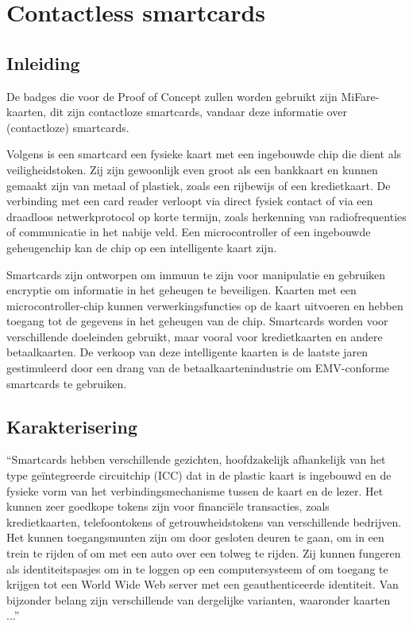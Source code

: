 \section{Contactless smartcards}
\subsection{Inleiding}
De badges die voor de Proof of Concept zullen worden gebruikt zijn MiFare-kaarten, dit zijn contactloze smartcards, vandaar deze informatie over (contactloze) smartcards.

Volgens \textcite{SwatiTawdeSmartCard} is een smartcard een fysieke kaart met een ingebouwde chip die dient als veiligheidstoken. Zij zijn gewoonlijk even groot als een bankkaart en kunnen gemaakt zijn van metaal of plastiek, zoals een rijbewijs of een kredietkaart. De verbinding met een card reader verloopt via direct fysiek contact of via een draadloos netwerkprotocol op korte termijn, zoals herkenning van radiofrequenties of communicatie in het nabije veld. Een microcontroller of een ingebouwde geheugenchip kan de chip op een intelligente kaart zijn. 

Smartcards zijn ontworpen om immuun te zijn voor manipulatie en gebruiken encryptie om informatie in het geheugen te beveiligen. Kaarten met een microcontroller-chip kunnen verwerkingsfuncties op de kaart uitvoeren en hebben toegang tot de gegevens in het geheugen van de chip. Smartcards worden voor verschillende doeleinden gebruikt, maar vooral voor kredietkaarten en andere betaalkaarten. De verkoop van deze intelligente kaarten is de laatste jaren gestimuleerd door een drang van de betaalkaartenindustrie om EMV-conforme smartcards te gebruiken. 

\subsection{Karakterisering}
``Smartcards hebben verschillende gezichten, hoofdzakelijk afhankelijk van het type geïntegreerde circuitchip (ICC) dat in de plastic kaart is ingebouwd en de fysieke vorm van het verbindingsmechanisme tussen de kaart en de lezer. Het kunnen zeer goedkope tokens zijn voor financiële transacties, zoals kredietkaarten, telefoontokens of getrouwheidstokens van verschillende bedrijven. Het kunnen toegangsmunten zijn om door gesloten deuren te gaan, om in een trein te rijden of om met een auto over een tolweg te rijden. Zij kunnen fungeren als identiteitspasjes om in te loggen op een computersysteem of om toegang te krijgen tot een World Wide Web server met een geauthenticeerde identiteit. Van bijzonder belang zijn verschillende van dergelijke varianten, waaronder kaarten ...''\autocite{OreillySmartCards}

